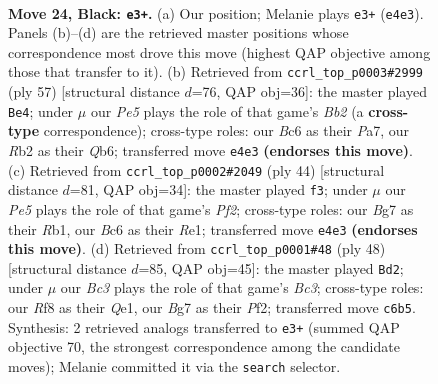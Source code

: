 \documentclass[11pt]{article}
\begin{document}
\clearpage

\begin{figure}[p]\centering
\begin{subfigure}{0.46\textwidth}\centering
\resizebox{\linewidth}{!}{%
\newchessgame
\chessboard[
  setfen={5rk1/p4pb1/2bp4/7p/P1q1p2P/8/1r3BK1/2RQ3R b - - 1 24},
  showmover=false,
  pgfstyle=straightmove, color=movearrow, markmove={e4-e3}
]}
\caption{}
\end{subfigure}\hfill
\begin{subfigure}{0.46\textwidth}\centering
\resizebox{\linewidth}{!}{%
\newchessgame
\chessboard[
  setfen={5rk1/pb4bp/1q1pp3/5p2/1QR2P2/4N3/PP5P/4R1K1 b - - 1 29},
  showmover=false,
  pgfstyle=straightmove, color=movearrow, markmove={b7-e4}
]}
\caption{}
\end{subfigure}
\\[4pt]
\begin{subfigure}{0.46\textwidth}\centering
\resizebox{\linewidth}{!}{%
\newchessgame
\chessboard[
  setfen={3r1rk1/pb4pp/4p3/3qB3/3p4/8/P1PQ1PPP/1R2R1K1 w - - 4 23},
  showmover=false,
  pgfstyle=straightmove, color=movearrow, markmove={f2-f3}
]}
\caption{}
\end{subfigure}\hfill
\begin{subfigure}{0.46\textwidth}\centering
\resizebox{\linewidth}{!}{%
\newchessgame
\chessboard[
  setfen={2r3k1/pR2pr1p/6p1/3P4/5q2/2B2B1b/P4PP1/4Q1K1 w - - 2 25},
  showmover=false,
  pgfstyle=straightmove, color=movearrow, markmove={c3-d2}
]}
\caption{}
\end{subfigure}
\caption{\textbf{Move 24, Black: \texttt{e3+}.} (a) Our position; Melanie plays \texttt{e3+} (\texttt{e4e3}). Panels (b)--(d) are the retrieved master positions whose correspondence most drove this move (highest QAP objective among those that transfer to it). (b) Retrieved from \texttt{ccrl\_top\_p0003\#2999} (ply 57) [structural distance $d$=76, QAP obj=36]: the master played \texttt{Be4}; under $\mu$ our \emph{Pe5} plays the role of that game's \emph{Bb2} (a \textbf{cross-type} correspondence); cross-type roles: our \emph{B}c6 as their \emph{P}a7, our \emph{R}b2 as their \emph{Q}b6; transferred move \texttt{e4e3} \textbf{(endorses this move)}. (c) Retrieved from \texttt{ccrl\_top\_p0002\#2049} (ply 44) [structural distance $d$=81, QAP obj=34]: the master played \texttt{f3}; under $\mu$ our \emph{Pe5} plays the role of that game's \emph{Pf2}; cross-type roles: our \emph{B}g7 as their \emph{R}b1, our \emph{B}c6 as their \emph{R}e1; transferred move \texttt{e4e3} \textbf{(endorses this move)}. (d) Retrieved from \texttt{ccrl\_top\_p0001\#48} (ply 48) [structural distance $d$=85, QAP obj=45]: the master played \texttt{Bd2}; under $\mu$ our \emph{Bc3} plays the role of that game's \emph{Bc3}; cross-type roles: our \emph{R}f8 as their \emph{Q}e1, our \emph{B}g7 as their \emph{P}f2; transferred move \texttt{c6b5}. Synthesis: 2 retrieved analogs transferred to \texttt{e3+} (summed QAP objective 70, the strongest correspondence among the candidate moves); Melanie committed it via the \texttt{search} selector.}
\label{fig:thought-m47}
\end{figure}
\end{document}
